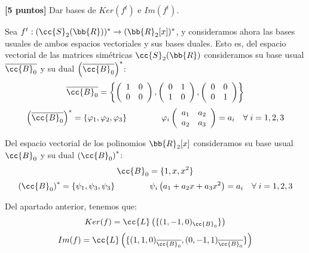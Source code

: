 \documentclass[12pt]{article}
\begin{document}
\begin{ejercicio}
    \textbf{[5 puntos]} Dar bases de $Ker(f^t)$ e $Im(f^t)$.

    Sea $f^t:(\cc{S}_2(\bb{R}))^\ast \to (\bb{R}_2[x])^\ast$, y consideramos ahora las bases usuales de ambos espacios vectoriales y sus bases duales. Esto es, del espacio vectorial de las matrices simétricas $\cc{S}_2(\bb{R})$ consideramos su base usual $\overline{\cc{B}_0}$ y su dual $\left(\overline{\cc{B}_0}\right)^\ast$:
    \begin{equation*}
        \overline{\cc{B}_0}=\left\{
        \left(\begin{array}{cc}
            1 & 0 \\
            0 & 0
        \end{array}\right),
        \left(\begin{array}{cc}
            0 & 1 \\
            1 & 0
        \end{array}\right),
        \left(\begin{array}{cc}
            0 & 0 \\
            0 & 1
        \end{array}\right)
        \right\}
    \end{equation*}
    \begin{equation*}
        \left(\overline{\cc{B}_0}\right)^\ast = \left\{\varphi_1,\varphi_2,\varphi_3\right\} \qquad \qquad \varphi_i\left(\begin{array}{cc}
            a_1 & a_2 \\
            a_2 & a_3
        \end{array}\right) = a_i \quad \forall\;i=1,2,3
    \end{equation*}

    Del espacio vectorial de los polinomios $\bb{R}_2[x]$ consideramos su base usual $\cc{B}_0$ y su dual $\left(\cc{B}_0\right)^\ast$:
    \begin{equation*}
        \cc{B}_0 = \{1,x,x^2\}
    \end{equation*}
    \begin{equation*}
        \left(\cc{B}_0\right)^\ast = \left\{\psi_1,\psi_3,\psi_3\right\} \qquad \qquad \psi_i\left(a_1 + a_2x + a_3x^2\right) = a_i \quad \forall\;i=1,2,3
    \end{equation*}

    Del apartado anterior, tenemos que:
    \begin{equation*}
        Ker(f) = \cc{L}\left(\{(1, -1, 0)_{\cc{B}_0}\}\right)
    \end{equation*}
    \begin{equation*}
        Im(f) = \cc{L}\left(\{(1, 1, 0)_{\overline{\cc{B}_0}}, (0, -1, 1)_{\overline{\cc{B}_0}}\}\right)
    \end{equation*}


\end{ejercicio}
\end{document}
